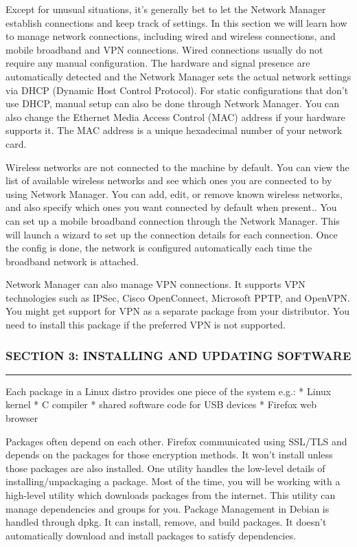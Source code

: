 Except for unusual situations, it's generally bet to let the Network
Manager establish connections and keep track of settings. In this
section we will learn how to manage network connections, including wired
and wireless connections, and mobile broadband and VPN connections.
Wired connections usually do not require any manual configuration. The
hardware and signal presence are automatically detected and the Network
Manager sets the actual network settings via DHCP (Dynamic Host Control
Protocol). For static configurations that don't use DHCP, manual setup
can also be done through Network Manager. You can also change the
Ethernet Media Access Control (MAC) address if your hardware supports
it. The MAC address is a unique hexadecimal number of your network card.

Wireless networks are not connected to the machine by default. You can
view the list of available wireless networks and see which ones you are
connected to by using Network Manager. You can add, edit, or remove
known wireless networks, and also specify which ones you want connected
by default when present.. You can set up a mobile broadband connection
through the Network Manager. This will launch a wizard to set up the
connection details for each connection. Once the config is done, the
network is configured automatically each time the broadband network is
attached.

Network Manager can also manage VPN connections. It supports VPN
technologies such as IPSec, Cisco OpenConnect, Microsoft PPTP, and
OpenVPN. You might get support for VPN as a separate package from your
distributor. You need to install this package if the preferred VPN is
not supported.

\subsubsection{SECTION 3: INSTALLING AND UPDATING
SOFTWARE}\label{section-3-installing-and-updating-software}

\begin{center}\rule{3in}{0.4pt}\end{center}

Each package in a Linux distro provides one piece of the system e.g.: *
Linux kernel * C compiler * shared software code for USB devices *
Firefox web browser

Packages often depend on each other. Firefox communicated using SSL/TLS
and depends on the packages for those encryption methods. It won't
install unless those packages are also installed. One utility handles
the low-level details of installing/unpackaging a package. Most of the
time, you will be working with a high-level utility which downloads
packages from the internet. This utility can manage dependencies and
groups for you. Package Management in Debian is handled through dpkg. It
can install, remove, and build packages. It doesn't automatically
download and install packages to satisfy dependencies.

